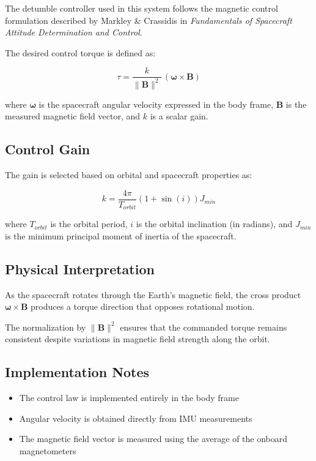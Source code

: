 The detumble controller used in this system follows the magnetic control formulation described by Markley \& Crassidis in \textit{Fundamentals of Spacecraft Attitude Determination and Control}.

The desired control torque is defined as:

\[
\tau = \frac{k}{\| \mathbf{B} \|^2} \, (\boldsymbol{\omega} \times \mathbf{B})
\]

where $\boldsymbol{\omega}$ is the spacecraft angular velocity expressed in the body frame, $\mathbf{B}$ is the measured magnetic field vector, and $k$ is a scalar gain.

\subsection{Control Gain}

The gain is selected based on orbital and spacecraft properties as:

\[
k = \frac{4\pi}{T_{orbit}} \left(1 + \sin(i)\right) J_{min}
\]

where $T_{orbit}$ is the orbital period, $i$ is the orbital inclination (in radians), and $J_{min}$ is the minimum principal moment of inertia of the spacecraft.

\subsection{Physical Interpretation}

As the spacecraft rotates through the Earth's magnetic field, the cross product $\boldsymbol{\omega} \times \mathbf{B}$ produces a torque direction that opposes rotational motion.

The normalization by $\| \mathbf{B} \|^2$ ensures that the commanded torque remains consistent despite variations in magnetic field strength along the orbit.

\subsection{Implementation Notes}

\begin{itemize}
	\item The control law is implemented entirely in the body frame
	\item Angular velocity is obtained directly from IMU measurements
	\item The magnetic field vector is measured using the average of the onboard magnetometers
\end{itemize}


